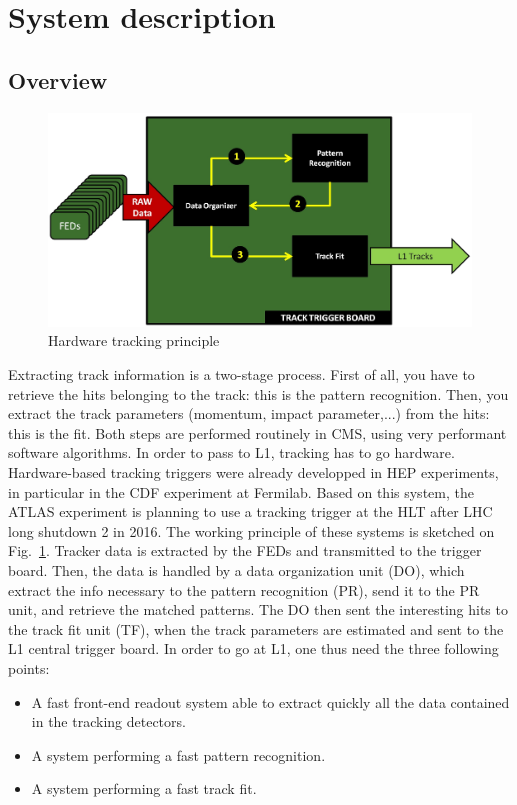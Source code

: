 \section{System description}

\subsection{Overview}

\begin{figure}[ht!]
\centering
\includegraphics[width=0.5\columnwidth]{Plots/L1TTrigPrinciple.eps}
\caption{Hardware tracking principle}
\label{fig:L1TT_principle}
\end{figure}

\noindent Extracting track information is a two-stage process. First of all, you have to retrieve the hits belonging to the track: this is the pattern recognition. Then, you extract the track parameters (momentum, impact parameter,...) from the hits: this is the fit. Both steps are performed routinely in CMS, using very performant software algorithms. In order to pass to L1, tracking has to go hardware. Hardware-based tracking triggers were already developped in HEP experiments, in particular in the CDF experiment at Fermilab. Based on this system, the ATLAS experiment is planning to use a tracking trigger at the HLT after LHC long shutdown 2 in 2016. The working principle of these systems is sketched on Fig.~\ref{fig:L1TT_principle}. Tracker data is extracted by the FEDs and transmitted to the trigger board. Then, the data is handled by a data organization unit (DO), which extract the info necessary to the pattern recognition (PR), send it to the PR unit, and retrieve the matched patterns. The DO then sent the interesting hits to the track fit unit (TF), when the track parameters are estimated and sent to the L1 central trigger board.
\noindent In order to go at L1, one thus need the three following points: 

\begin{itemize}
\item A fast front-end readout system able to extract quickly all the data contained in the tracking detectors.
\item A system performing a fast pattern recognition.
\item A system performing a fast track fit.
\end{itemize}

